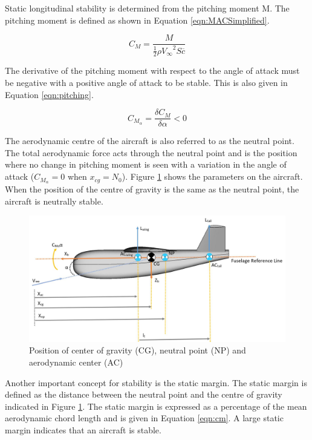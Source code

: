 Static longitudinal stability is determined from the pitching moment M. The pitching moment is defined as shown in Equation \ref{eqn:MACSimplified}.

\begin{equation}
    C_M = \frac{M}{\frac{1}{2}\rho {V_\infty}^2 S \overline{c}}
\end{equation}

The derivative of the pitching moment with respect to the angle of attack must be negative with a positive angle of attack to be stable. This is also given in Equation \ref{eqn:pitching}.

\begin{equation}
    C_{M_\alpha} = \frac{\delta C_M}{\delta \alpha} < 0 
    \label{eqn:pitching}
\end{equation}

The aerodynamic centre of the aircraft is also referred to as the neutral point. The total aerodynamic force acts through the neutral point and is the position where no change in pitching moment is seen with a variation in the angle of attack ($C_{M_\alpha} = 0$ when $x_{cg} = N_0$). Figure \ref{fig:AC} shows the parameters on the aircraft. When the position of the centre of gravity is the same as the neutral point, the aircraft is neutrally stable. 

\begin{figure}[H]
  \centering
   \includegraphics[width=1\linewidth]{03_LiteratureReview/Figs/CGNPAC.JPG}
  \caption{Position of center of gravity (CG), neutral point (NP) and aerodynamic center (AC)}
  \label{fig:AC}
\end{figure}

Another important concept for stability is the static margin. The static margin is defined as the distance between the neutral point and the centre of gravity indicated in Figure \ref{fig:AC}. The static margin is expressed as a percentage of the mean aerodynamic chord length and is given in Equation \ref{eqn:cm}. A large static margin indicates that an aircraft is stable. 

